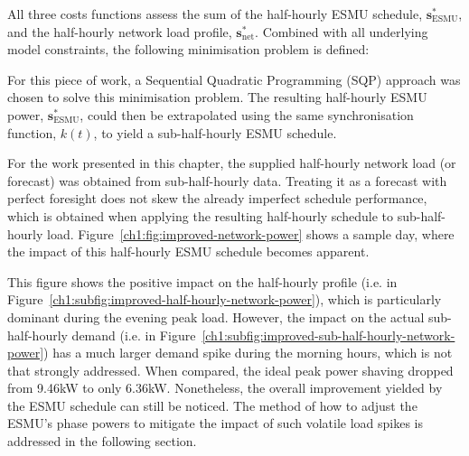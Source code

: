 All three costs functions assess the sum of the half-hourly ESMU schedule, $\textbf{s}^*_\text{ESMU}$, and the half-hourly network load profile, $\textbf{s}^*_\text{net}$.
Combined with all underlying model constraints, the following minimisation problem is defined:



For this piece of work, a Sequential Quadratic Programming (SQP) approach was chosen to solve this minimisation problem.
The resulting half-hourly ESMU power, $\textbf{s}^*_\text{ESMU}$, could then be extrapolated using the same synchronisation function, $k(t)$, to yield a sub-half-hourly ESMU schedule.

For the work presented in this chapter, the supplied half-hourly network load (or forecast) was obtained from sub-half-hourly data.
Treating it as a forecast with perfect foresight does not skew the already imperfect schedule performance, which is obtained when applying the resulting half-hourly schedule to sub-half-hourly load.
Figure~\ref{ch1:fig:improved-network-power} shows a sample day, where the impact of this half-hourly ESMU schedule becomes apparent.



This figure shows the positive impact on the half-hourly profile (i.e. in Figure~\ref{ch1:subfig:improved-half-hourly-network-power}), which is particularly dominant during the evening peak load.
However, the impact on the actual sub-half-hourly demand (i.e. in Figure~\ref{ch1:subfig:improved-sub-half-hourly-network-power}) has a much larger demand spike during the morning hours, which is not that strongly addressed.
When compared, the ideal peak power shaving dropped from 9.46kW to only 6.36kW.
Nonetheless, the overall improvement yielded by the ESMU schedule can still be noticed. 
The method of how to adjust the ESMU's phase powers to mitigate the impact of such volatile load spikes is addressed in the following section.

